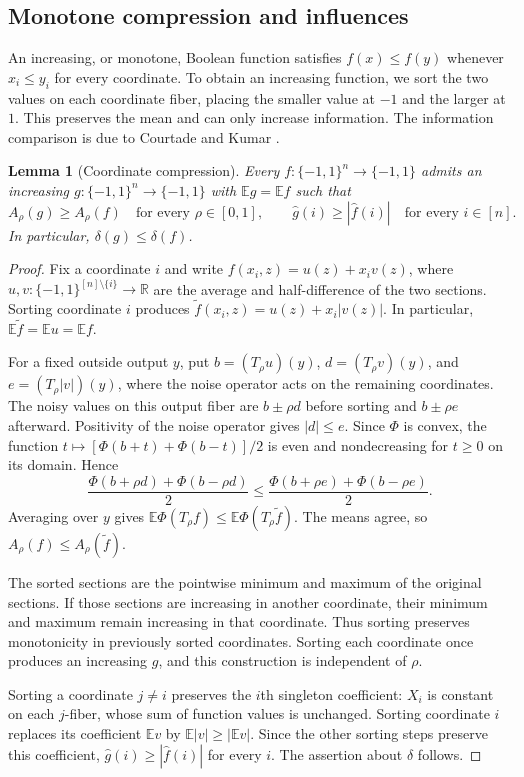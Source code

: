 \documentclass[11pt,letterpaper]{amsart}
\newcommand{\E}{\mathbb E}
\newcommand{\R}{\mathbb R}
\newcommand{\1}{\mathbf 1}
\newtheorem{lemma}[theorem]{Lemma}
\numberwithin{equation}{section}
\begin{document}
\subsection{Monotone compression and influences}

An increasing, or monotone, Boolean function satisfies $f(x)\le f(y)$
whenever $x_i\le y_i$ for every coordinate.
To obtain an increasing function, we sort the two values on each
coordinate fiber, placing the smaller value at $-1$ and the larger
at $1$. This preserves the mean and can only increase information.
The information comparison is due to Courtade and Kumar
\cite[Lemma~2 and Remark~2]{CourtadeKumar2014}.

\begin{lemma}[Coordinate compression]\label{lem:compression}
Every $f:\{-1,1\}^n\to\{-1,1\}$ admits an increasing
$g:\{-1,1\}^n\to\{-1,1\}$ with $\E g=\E f$ such that
\[
 A_\rho(g)\ge A_\rho(f)
 \quad\text{for every }\rho\in[0,1],
 \qquad
 \widehat g(i)\ge|\widehat f(i)|
 \quad\text{for every }i\in[n].
\]
In particular, $\delta(g)\le\delta(f)$.
\end{lemma}

\begin{proof}
Fix a coordinate $i$ and write
$f(x_i,z)=u(z)+x_i v(z)$, where
$u,v:\{-1,1\}^{[n]\setminus\{i\}}\to\R$ are the average and
half-difference of the two sections.
Sorting coordinate $i$ produces
$\widetilde f(x_i,z)=u(z)+x_i|v(z)|$.
In particular, $\E\widetilde f=\E u=\E f$.

For a fixed outside output $y$, put
$b=(T_\rho u)(y)$, $d=(T_\rho v)(y)$, and
$e=(T_\rho|v|)(y)$, where the noise operator acts on the
remaining coordinates.
The noisy values on this output fiber are $b\pm\rho d$
before sorting and $b\pm\rho e$ afterward.
Positivity of the noise operator gives $|d|\le e$.
Since $\Phi$ is convex, the function
$t\mapsto[\Phi(b+t)+\Phi(b-t)]/2$
is even and nondecreasing for $t\ge0$ on its domain.
Hence
\[
 \frac{\Phi(b+\rho d)+\Phi(b-\rho d)}2
 \le
 \frac{\Phi(b+\rho e)+\Phi(b-\rho e)}2.
\]
Averaging over $y$ gives
$\E\Phi(T_\rho f)\le\E\Phi(T_\rho\widetilde f)$.
The means agree, so
$A_\rho(f)\le A_\rho(\widetilde f)$.

The sorted sections are the pointwise minimum and maximum of
the original sections. If those sections are increasing in
another coordinate, their minimum and maximum remain increasing
in that coordinate.
Thus sorting preserves monotonicity in previously sorted
coordinates. Sorting each coordinate once produces an increasing
$g$, and this construction is independent of $\rho$.

Sorting a coordinate $j\ne i$ preserves the $i$th singleton
coefficient: $X_i$ is constant on each $j$-fiber, whose sum of
function values is unchanged.
Sorting coordinate $i$ replaces its coefficient $\E v$ by
$\E|v|\ge|\E v|$.
Since the other sorting steps preserve this coefficient,
$\widehat g(i)\ge|\widehat f(i)|$ for every $i$.
The assertion about $\delta$ follows.
\end{proof}
\end{document}
